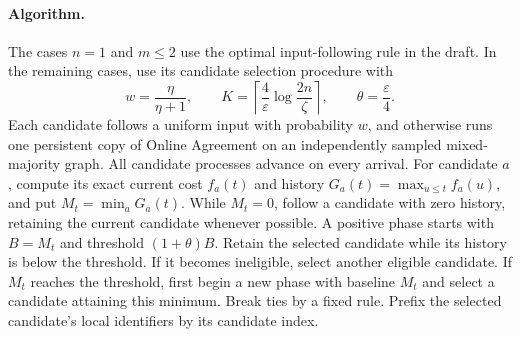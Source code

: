 \documentclass[11pt]{article}
\begin{document}
\paragraph{Algorithm.}
The cases $n=1$ and $m\le2$ use the optimal input-following rule in the
draft. In the remaining cases, use its candidate selection procedure with
\[
 w=\frac{\eta}{\eta+1},\qquad
 K=\left\lceil\frac4\varepsilon\log\frac{2n}{\zeta}\right\rceil,
 \qquad \theta=\frac\varepsilon4.
\]
Each candidate follows a uniform input with probability $w$, and otherwise
runs one persistent copy of Online Agreement on an independently sampled
mixed-majority graph. All candidate processes advance on every arrival.
For candidate $a$, compute its exact current cost $f_a(t)$ and history
$G_a(t)=\max_{u\le t}f_a(u)$, and put $M_t=\min_aG_a(t)$.
While $M_t=0$, follow a candidate with zero history, retaining the current
candidate whenever possible. A positive phase starts with $B=M_t$ and
threshold $(1+\theta)B$. Retain the selected candidate while its history
is below the threshold. If it becomes ineligible, select another eligible
candidate. If $M_t$ reaches the threshold, first begin a new phase with
baseline $M_t$ and select a candidate attaining this minimum. Break ties
by a fixed rule. Prefix the selected candidate's local identifiers by its
candidate index.
\end{document}
